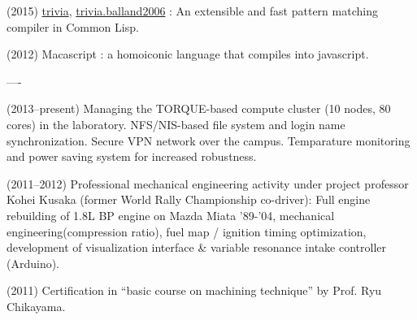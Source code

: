 \documentclass[letterpaper,12pt]{article}
\begin{document}
(2015) \href{https://github.com/guicho271828/trivia}{trivia},
\href{https://github.com/guicho271828/trivia.balland2006}{trivia.balland2006}
: An extensible and fast pattern matching compiler in Common Lisp.

(2012) Macascript : a homoiconic language that compiles into javascript.

----

(2013--present)
 Managing the TORQUE-based compute cluster (10 nodes, 80 cores) in the laboratory.
 NFS/NIS-based file system and login name synchronization.
 Secure VPN network over the campus.
 Temparature monitoring and power saving system for increased robustness.

(2011--2012) Professional mechanical engineering
 activity under project professor Kohei Kusaka (former World Rally
 Championship co-driver):
 Full engine rebuilding of 1.8L BP engine on Mazda Miata '89-'04,
 mechanical engineering(compression ratio),
 fuel map / ignition timing optimization, development of visualization
 interface \& variable resonance intake controller (Arduino).

(2011) Certification in ``basic course on machining technique'' by Prof. Ryu Chikayama.



% 
% 
% 
\end{document}
